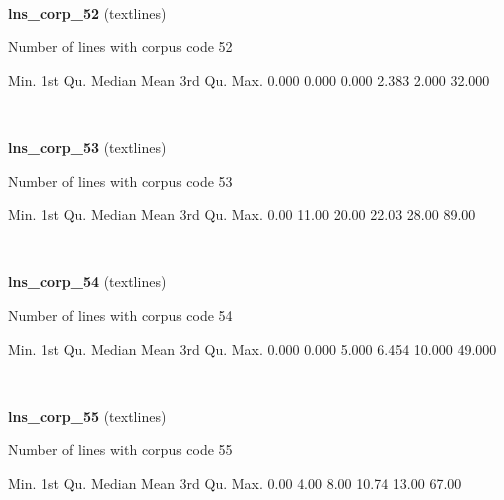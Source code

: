 \documentclass[]{article}
\newenvironment{Shaded}{\begin{snugshade}}{\end{snugshade}}
\newcommand{\FloatTok}[1]{\textcolor[rgb]{0.00,0.00,0.81}{{#1}}}
\newcommand{\NormalTok}[1]{{#1}}
\begin{document}
~

\vspace{1em}

\textbf{lns\_corp\_52} (textlines)

Number of lines with corpus code 52

\begin{Shaded}
\begin{Highlighting}[]
   \NormalTok{Min. 1st Qu.  Median    Mean 3rd Qu.    Max. }
  \FloatTok{0.000}   \FloatTok{0.000}   \FloatTok{0.000}   \FloatTok{2.383}   \FloatTok{2.000}  \FloatTok{32.000} 
\end{Highlighting}
\end{Shaded}

~

\vspace{1em}

\textbf{lns\_corp\_53} (textlines)

Number of lines with corpus code 53

\begin{Shaded}
\begin{Highlighting}[]
   \NormalTok{Min. 1st Qu.  Median    Mean 3rd Qu.    Max. }
   \FloatTok{0.00}   \FloatTok{11.00}   \FloatTok{20.00}   \FloatTok{22.03}   \FloatTok{28.00}   \FloatTok{89.00} 
\end{Highlighting}
\end{Shaded}

~

\vspace{1em}

\textbf{lns\_corp\_54} (textlines)

Number of lines with corpus code 54

\begin{Shaded}
\begin{Highlighting}[]
   \NormalTok{Min. 1st Qu.  Median    Mean 3rd Qu.    Max. }
  \FloatTok{0.000}   \FloatTok{0.000}   \FloatTok{5.000}   \FloatTok{6.454}  \FloatTok{10.000}  \FloatTok{49.000} 
\end{Highlighting}
\end{Shaded}

~

\vspace{1em}

\textbf{lns\_corp\_55} (textlines)

Number of lines with corpus code 55

\begin{Shaded}
\begin{Highlighting}[]
   \NormalTok{Min. 1st Qu.  Median    Mean 3rd Qu.    Max. }
   \FloatTok{0.00}    \FloatTok{4.00}    \FloatTok{8.00}   \FloatTok{10.74}   \FloatTok{13.00}   \FloatTok{67.00} 
\end{Highlighting}
\end{Shaded}
\end{document}
